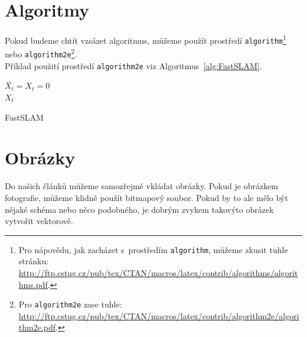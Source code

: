 \documentclass[a4paper, 11pt]{article}
\begin{document}
\section{Algoritmy}\label{Algotitmy}
Pokud budeme chtít vzsázet algoritmus, můžeme použít prostředí \verb|algorithm|\footnote{Pro nápovědu, jak zacházet s~prostředím \texttt{algorithm}, můžeme zkusit tuhle stránku:\\
	\url{http://ftp.cstug.cz/pub/tex/CTAN/macros/latex/contrib/algorithms/algorithms.pdf}.}
nebo \verb|algorithm2e|\footnote{Pro \texttt{algorithm2e} zase tuhle:\\
	\url{http://ftp.cstug.cz/pub/tex/CTAN/macros/latex/contrib/algorithm2e/algorithm2e.pdf}.}.\\
Příklad použití prostředí \verb|algorithm2e| viz Algoritmus~\ref{alg:FastSLAM}.
\bigskip
\begin{algorithm}[h]
	\SetNlSty{}{}{:}
	$\overline{X_t} = X_t = 0$\\
	\KwRet $X_t$
	\caption{FastSLAM}
	\label{alg:FastSLAM}
\end{algorithm}

\section{Obrázky}
Do našich článků můžeme samozřejmě vkládat obrázky. Pokud je obrázkem fotografie, můžeme klidně použít bitmapový soubor. Pokud by to ale mělo být nějaké schéma nebo něco podobného, je dobrým zvykem takovýto obrázek vytvořit vektorově.
\end{document}
